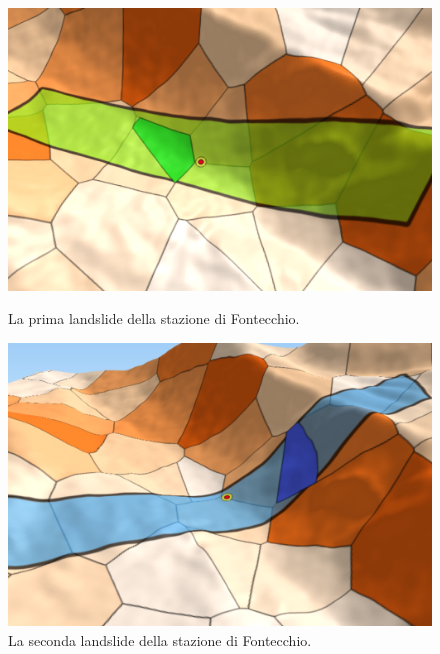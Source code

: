 	\begin{figure}[h]
	\hspace{0.1\linewidth}
	\begin{minipage}[t]{0.35\linewidth}
		\centering
		\includegraphics[width=1\textwidth]{images/FontecchioLandslide1}
		\caption{La prima landslide della stazione di Fontecchio.}
		\label{fontecchiolandslide1}
	\end{minipage}
	\hspace{0.1\linewidth}
	\begin{minipage}[t]{0.35\linewidth}
		\centering
		\includegraphics[width=1\textwidth]{images/FontecchioLandslide2}
		\caption{La seconda landslide della stazione di Fontecchio.}
		\label{fontecchiolandslide2}
	\end{minipage}
\end{figure}

